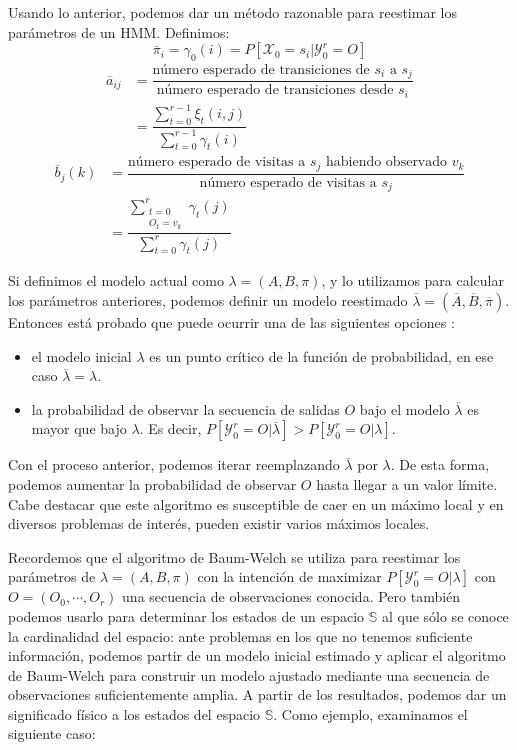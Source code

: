 Usando lo anterior, podemos dar un método razonable para reestimar los parámetros de un HMM. Definimos:
\[\overline{\pi}_i=\gamma_0(i)=P[\mathcal{X}_0=s_i|\mathcal{Y}_0^r=O]\]
\begin{align*}
    \overline{a}_{ij}&=\dfrac{\text{número esperado de transiciones de $s_i$ a $s_j$}}{\text{número esperado de transiciones desde $s_i$}} \\
    &=\dfrac{\displaystyle\sum_{t=0}^{r-1}\xi_t(i,j)}{\displaystyle\sum_{t=0}^{r-1}\gamma_t(i)}
\end{align*}
\begin{align*}
    \overline{b}_j(k)&=\dfrac{\text{número esperado de visitas a $s_j$ habiendo observado $v_k$}}{\text{número esperado de visitas a $s_j$}}\\
    &=\dfrac{\displaystyle\sum_{\substack{t=0 \\ O_t=v_k}}^{r}\gamma_t(j)}{\displaystyle\sum_{t=0}^{r}\gamma_t(j)}
\end{align*}

Si definimos el modelo actual como $\lambda=(A,B,\pi)$, y lo utilizamos para calcular los parámetros anteriores, podemos definir un modelo reestimado $\overline{\lambda}=(\overline{A},\overline{B},\overline{\pi})$. Entonces está probado que puede ocurrir una de las siguientes opciones \cite{Rabiner}:
\begin{itemize}
    \item el modelo inicial $\lambda$ es un punto crítico de la función de probabilidad, en ese caso $\overline{\lambda}=\lambda$.
    \item la probabilidad de observar la secuencia de salidas $O$ bajo el modelo $\overline{\lambda}$ es mayor que bajo $\lambda$. Es decir, $P[\mathcal{Y}_0^r=O|\overline{\lambda}]>P[\mathcal{Y}_0^r=O|\lambda]$.
\end{itemize}

Con el proceso anterior, podemos iterar reemplazando $\overline{\lambda}$ por $\lambda$. De esta forma, podemos aumentar la probabilidad de observar $O$ hasta llegar a un valor límite. Cabe destacar que este algoritmo es susceptible de caer en un máximo local y en diversos problemas de interés, pueden existir varios máximos locales.

Recordemos que el algoritmo de Baum-Welch se utiliza para reestimar los parámetros de $\lambda=(A,B,\pi)$ con la intención de maximizar $P[\mathcal{Y}_0^r=O|\lambda]$ con $O=(O_0,\cdots,O_r)$ una secuencia de observaciones conocida. Pero también podemos usarlo para determinar los estados de un espacio $\mathbb{S}$ al que sólo se conoce la cardinalidad del espacio: ante problemas en los que no tenemos suficiente información, podemos partir de un modelo inicial estimado y aplicar el algoritmo de Baum-Welch para construir un modelo ajustado mediante una secuencia de observaciones suficientemente amplia. A partir de los resultados, podemos dar un significado físico a los estados del espacio $\mathbb{S}$. Como ejemplo, examinamos el siguiente caso: 



